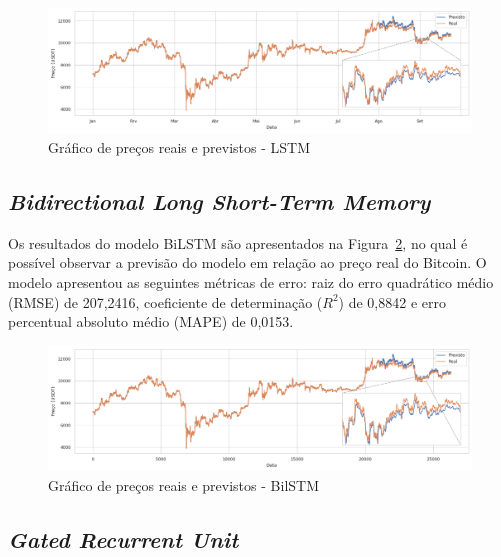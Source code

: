 \begin{figure}[!htb] \centering
  \caption{Gráfico de preços reais e previstos - LSTM} \label{figura:lstmOutput}
  \begin{varwidth}{\linewidth}
    \includegraphics[width=16cm]{figuras/lstmOutput.png}
  \end{varwidth}
\end{figure}



\subsection{\textit{Bidirectional Long Short-Term Memory}}

Os resultados do modelo BiLSTM são apresentados na Figura~\ref{figura:bilstmOutput}, no qual é possível observar a previsão do modelo em relação ao preço real do Bitcoin. O modelo apresentou as seguintes métricas de erro: raiz do erro quadrático médio (RMSE) de 207,2416, coeficiente de determinação ($R^2$) de 0,8842 e erro percentual absoluto médio (MAPE) de 0,0153.

\begin{figure}[!htb] \centering
  \caption{Gráfico de preços reais e previstos - BilSTM} \label{figura:bilstmOutput}
  \begin{varwidth}{\linewidth}
    \includegraphics[width=16cm]{figuras/bilstmOutput.png}
  \end{varwidth}
\end{figure}

\subsection{\textit{Gated Recurrent Unit}}

